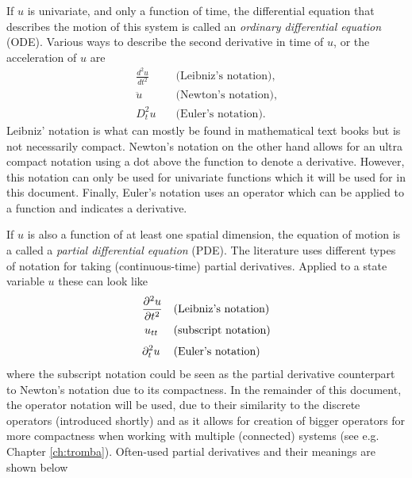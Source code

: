 If $u$ is univariate, and only a function of time, the differential equation that describes the motion of this system is called an \textit{ordinary differential equation} (ODE). Various ways to describe the second derivative in time of $u$, or the acceleration of $u$ are
%
\begin{equation}\nonumber
    \begin{aligned}
        \frac{d^2 u}{d t^2} & \quad \text{(Leibniz's notation)},\\
        \ddot u\ \  &\quad \text{(Newton's notation)},\\[3pt]
        D_t^2 u& \quad \text{(Euler's notation)}.
    \end{aligned}
\end{equation}
%
Leibniz' notation is what can mostly be found in mathematical text books but is not necessarily compact. Newton's notation on the other hand allows for an ultra compact notation using a dot above the function to denote a derivative. However, this notation can only be used for univariate functions which it will be used for in this document. Finally, Euler's notation uses an operator which can be applied to a function and indicates a derivative.  
 
If $u$ is also a function of at least one spatial dimension, the equation of motion is a called a \textit{partial differential equation} (PDE).
The literature uses different types of notation for taking (continuous-time) partial derivatives. Applied to a state variable $u$ these can look like 
\begin{equation}\nonumber
    \begin{aligned}
        \frac{\partial^2 u}{\partial t^2} & \quad \text{(Leibniz's notation)}\\
        u_{tt}\:\,& \quad \text{(subscript notation)}\\[3pt]
        \partial_t^2 u\: & \quad \text{(Euler's notation)}
    \end{aligned}
\end{equation}
% 
%
%
where the subscript notation could be seen as the partial derivative counterpart to Newton's notation due to its compactness. In the remainder of this document, the operator notation will be used, due to their similarity to the discrete operators (introduced shortly) and as it allows for creation of bigger operators for more compactness when working with multiple (connected) systems (see e.g. Chapter \ref{ch:tromba}).
Often-used partial derivatives and their meanings  are shown below

